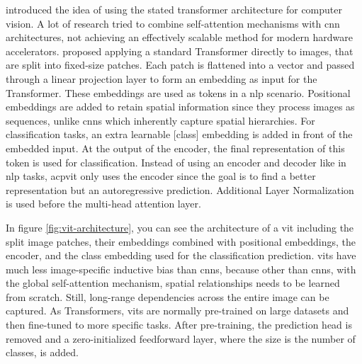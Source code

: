 \documentclass[conference]{IEEEtran}
\begin{document}
  \citeauthor{visiontransformers2021} \cite{visiontransformers2021} introduced the idea of using the stated transformer architecture for computer vision. A lot of research tried to combine self-attention mechanisms with \ac{cnn} architectures, not achieving an effectively scalable method for modern hardware accelerators. \cite{visiontransformers2021} proposed applying a standard Transformer directly to images, that are split into fixed-size patches. Each patch is flattened into a vector and passed through a linear projection layer to form an embedding as input for the Transformer. These embeddings are used as tokens in a \ac{nlp} scenario. Positional embeddings are added to retain spatial information since they process images as sequences, unlike \acp{cnn} which inherently capture spatial hierarchies. For classification tasks, an extra learnable [class] embedding is added in front of the embedded input. At the output of the encoder, the final representation of this token is used for classification. Instead of using an encoder and decoder like in \ac{nlp} tasks, acp{vit} only uses the encoder since the goal is to find a better representation but an autoregressive prediction. Additional Layer Normalization is used before the multi-head attention layer. \cite{vit-state-challenges}
  
  In figure \ref{fig:vit-architecture}, you can see the architecture of a \ac{vit} including the split image patches, their embeddings combined with positional embeddings, the encoder, and the class embedding used for the classification prediction. \acp{vit} have much less image-specific inductive bias than \acp{cnn}, because other than \acp{cnn}, with the global self-attention mechanism, spatial relationships needs to be learned from scratch. Still, long-range dependencies across the entire image can be captured.  As Transformers, \acp{vit} are normally pre-trained on large datasets and then fine-tuned to more specific tasks. After pre-training, the prediction head is removed and a zero-initialized feedforward layer, where the size is the number of classes, is added.
\end{document}
